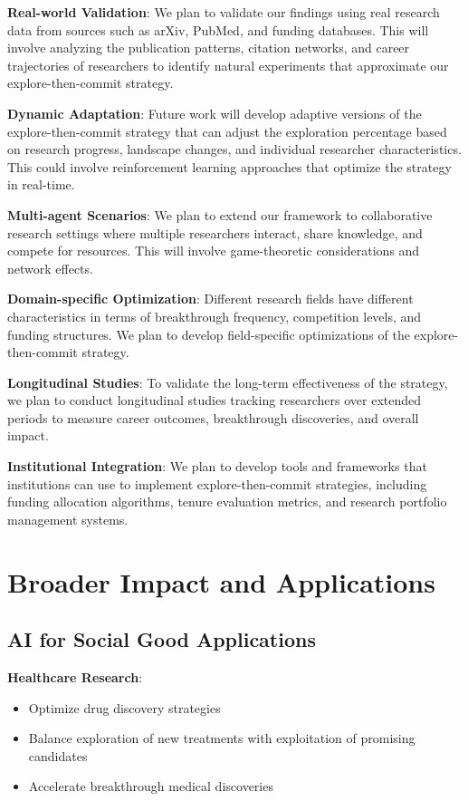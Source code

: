\documentclass[letterpaper]{article} %
\begin{document}
\textbf{Real-world Validation}: We plan to validate our findings using real research data from sources such as arXiv, PubMed, and funding databases. This will involve analyzing the publication patterns, citation networks, and career trajectories of researchers to identify natural experiments that approximate our explore-then-commit strategy.

\textbf{Dynamic Adaptation}: Future work will develop adaptive versions of the explore-then-commit strategy that can adjust the exploration percentage based on research progress, landscape changes, and individual researcher characteristics. This could involve reinforcement learning approaches that optimize the strategy in real-time.

\textbf{Multi-agent Scenarios}: We plan to extend our framework to collaborative research settings where multiple researchers interact, share knowledge, and compete for resources. This will involve game-theoretic considerations and network effects.

\textbf{Domain-specific Optimization}: Different research fields have different characteristics in terms of breakthrough frequency, competition levels, and funding structures. We plan to develop field-specific optimizations of the explore-then-commit strategy.

\textbf{Longitudinal Studies}: To validate the long-term effectiveness of the strategy, we plan to conduct longitudinal studies tracking researchers over extended periods to measure career outcomes, breakthrough discoveries, and overall impact.

\textbf{Institutional Integration}: We plan to develop tools and frameworks that institutions can use to implement explore-then-commit strategies, including funding allocation algorithms, tenure evaluation metrics, and research portfolio management systems.

\section{Broader Impact and Applications}

\subsection{AI for Social Good Applications}

\textbf{Healthcare Research}:
\begin{itemize}
\item Optimize drug discovery strategies
\item Balance exploration of new treatments with exploitation of promising candidates
\item Accelerate breakthrough medical discoveries
\end{itemize}
\end{document}
